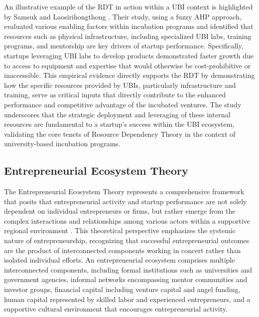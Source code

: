 \documentclass[../Main.tex]{subfiles}
\begin{document}
An illustrative example of the RDT in action within a UBI context is highlighted by Samsuk and Laosirihongthong \autocite{samsuk2014fuzzy}. Their study, using a fuzzy AHP approach, evaluated various enabling factors within incubation programs and identified that resources such as physical infrastructure, including specialized UBI labs, training programs, and mentorship are key drivers of startup performance. Specifically, startups leveraging UBI labs to develop products demonstrated faster growth due to access to equipment and expertise that would otherwise be cost-prohibitive or inaccessible. This empirical evidence directly supports the RDT by demonstrating how the specific resources provided by UBIs, particularly infrastructure and training, serve as critical inputs that directly contribute to the enhanced performance and competitive advantage of the incubated ventures. The study underscores that the strategic deployment and leveraging of these internal resources are fundamental to a startup's success within the UBI ecosystem, validating the core tenets of Resource Dependency Theory in the context of university-based incubation programs.


\subsection{Entrepreneurial Ecosystem Theory}

The Entrepreneurial Ecosystem Theory represents a comprehensive framework that posits that entrepreneurial activity and startup performance are not solely dependent on individual entrepreneurs or firms, but rather emerge from the complex interactions and relationships among various actors within a supportive regional environment \autocite{spigel2017relational}. This theoretical perspective emphasizes the systemic nature of entrepreneurship, recognizing that successful entrepreneurial outcomes are the product of interconnected components working in concert rather than isolated individual efforts. An entrepreneurial ecosystem comprises multiple interconnected components, including formal institutions such as universities and government agencies, informal networks encompassing mentor communities and investor groups, financial capital including venture capital and angel funding, human capital represented by skilled labor and experienced entrepreneurs, and a supportive cultural environment that encourages entrepreneurial activity.
\end{document}
